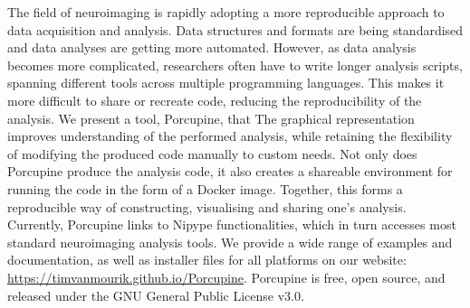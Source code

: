 
The field of neuroimaging is rapidly adopting a more reproducible approach to data acquisition and analysis. Data structures and formats are being standardised and data analyses are getting more automated. However, as data analysis becomes more complicated, researchers often have to write longer analysis scripts, spanning different tools across multiple programming languages. This makes it more difficult to share or recreate code, reducing the reproducibility of the analysis. 
We present a tool, Porcupine, that  The graphical representation improves understanding of the performed analysis, while retaining the flexibility of modifying the produced code manually to custom needs. Not only does Porcupine produce the analysis code, it also creates a shareable environment for running the code in the form of a Docker image. Together, this forms a reproducible way of constructing, visualising and sharing one's analysis. Currently, Porcupine links to Nipype functionalities, which in turn accesses most standard neuroimaging analysis tools.  
We provide a wide range of examples and documentation, as well as installer files for all platforms on our website: \url{https://timvanmourik.github.io/Porcupine}. Porcupine is free, open source, and released under the GNU General Public License v3.0.